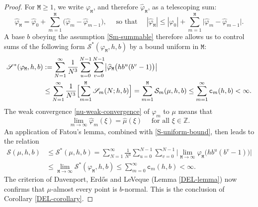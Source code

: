 \documentclass[12pt, twoside]{article}
\theoremstyle{definition}
\numberwithin{equation}{section}
\begin{document}
\begin{proof}
For $\mathtt M \geq 1$, we write $\varphi_{\mathtt M}$, and therefore $\widehat{\varphi}_{\mathtt M}$, as a telescoping sum: 
\[ \widehat{\varphi}_{\mathtt M} = \widehat{\varphi}_{0} + \sum_{m=1}^{\mathtt M} \bigl(\widehat{\varphi}_{m} - \widehat{\varphi}_{m-1}\bigr), \quad \text{ so that } \quad |\widehat{\varphi}_{\mathtt M}| \leq |\widehat{\varphi}_{0}| + \sum_{m=1}^{\mathtt M} \bigl|\widehat{\varphi}_{m} - \widehat{\varphi}_{m-1}\bigr|.  \] 
A base $b$ obeying the assumption \eqref{Sm-summable} therefore allows us to control sums of the following form $\mathscr{S}^\ast (\varphi_{\mathtt M}, h, b) $ by a bound uniform in $\mathtt M$: 
\begin{align} 
\mathscr{S}^{\ast}(\varphi_{\mathtt M}, h, b) &:= \sum_{N=1}^{\infty} \frac{1}{N^{3}} \sum_{u = 0}^{N-1} \sum_{v = 0}^{N-1} \bigl|\widehat{\varphi}_{\mathtt M}\bigl(hb^u (b^v-1) \bigr) \bigr| \nonumber \\ &\leq  \sum_{N=1}^{\infty}  \frac{1}{N^{3}} \Bigl[ \sum_{m=1}^{\mathtt M} \mathscr{S}_m(N; h, b)  \Bigr] = \sum_{m=1}^{\mathtt M} \mathcal S_m(\mu, h, b) \leq \sum_{m=1}^{\infty} \mathtt c_m(h, b) < \infty. \label{S-uniform-bound} 
\end{align}   
The weak convergence \eqref{nu-weak-convergence} of $\varphi_m$ to $\mu$ means that 
\[ \lim_{m \rightarrow \infty} \widehat{\varphi}_m(\xi) = \widehat{\mu}(\xi) \quad \text{ for all } \xi \in \mathbb Z.  \]  An application of Fatou's lemma, combined with \eqref{S-uniform-bound}, then leads to the relation 
\begin{align*} \mathscr{S}(\mu, h, b) &\leq \mathscr{S}^{\ast}(\mu, h, b) = \sum_{N=1}^{\infty} \frac{1}{N^{3}} \sum_{u = 0}^{N-1} \sum_{v = 0}^{N-1} \bigl|\lim_{\mathtt M \rightarrow \infty}\widehat{\varphi}_{\mathtt M} \bigl(hb^u (b^v-1) \bigr) \bigr|  \\
 &\leq \lim_{\mathtt M \rightarrow \infty} \mathscr{S}^{\ast}(\varphi_{\mathtt M}, h, b) \leq   \sum_{m=0}^{\infty} \mathtt c_m(h, b)  < \infty. \end{align*} 
The criterion of Davenport, Erd\H{o}s and LeVeque (Lemma \ref{DEL-lemma}) now confirms that $\mu$-almost every point is $b$-normal. This is the conclusion of Corollary \ref{DEL-corollary}. 
\end{proof}
\end{document}
